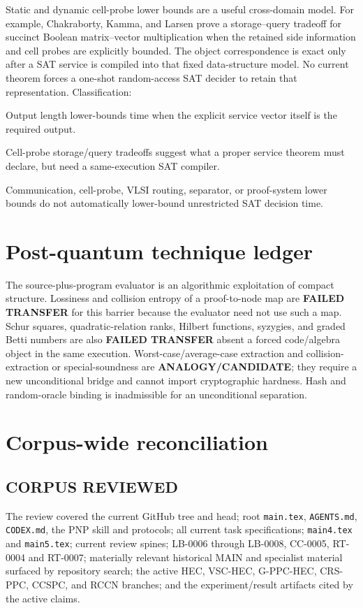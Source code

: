 \documentclass[11pt]{article}
\begin{document}
Static and dynamic cell-probe lower bounds are a useful cross-domain model.
For example, Chakraborty, Kamma, and Larsen prove a storage--query tradeoff for
succinct Boolean matrix--vector multiplication when the retained side
information and cell probes are explicitly bounded.  The object
correspondence is exact only after a SAT service is compiled into that fixed
data-structure model.  No current theorem forces a one-shot random-access SAT
decider to retain that representation.  Classification:

\begin{description}[leftmargin=3.4cm,style=nextline]
\item[THEOREM TRANSFER.] Output length lower-bounds time when the explicit
service vector itself is the required output.
\item[ANALOGY / CANDIDATE.] Cell-probe storage/query tradeoffs suggest what a
proper service theorem must declare, but need a same-execution SAT compiler.
\item[FAILED TRANSFER.] Communication, cell-probe, VLSI routing, separator,
or proof-system lower bounds do not automatically lower-bound unrestricted
SAT decision time.
\end{description}

\section{Post-quantum technique ledger}

The source-plus-program evaluator is an algorithmic exploitation of compact
structure.  Lossiness and collision entropy of a proof-to-node map are
\textbf{FAILED TRANSFER} for this barrier because the evaluator need not use
such a map.  Schur squares, quadratic-relation ranks, Hilbert functions,
syzygies, and graded Betti numbers are also \textbf{FAILED TRANSFER} absent a
forced code/algebra object in the same execution.  Worst-case/average-case
extraction and collision-extraction or special-soundness are
\textbf{ANALOGY/CANDIDATE}; they require a new unconditional bridge and cannot
import cryptographic hardness.  Hash and random-oracle binding is inadmissible
for an unconditional separation.

\section{Corpus-wide reconciliation}

\subsection*{CORPUS REVIEWED}
The review covered the current GitHub tree and head; root \texttt{main.tex},
\texttt{AGENTS.md}, \texttt{CODEX.md}, the PNP skill and protocols; all current
task specifications; \texttt{main4.tex} and \texttt{main5.tex}; current review
spines; LB-0006 through LB-0008, CC-0005, RT-0004 and RT-0007; materially
relevant historical MAIN and specialist material surfaced by repository
search; the active HEC, VSC-HEC, G-PPC-HEC, CRS-PPC, CCSPC, and RCCN branches;
and the experiment/result artifacts cited by the active claims.
\end{document}
